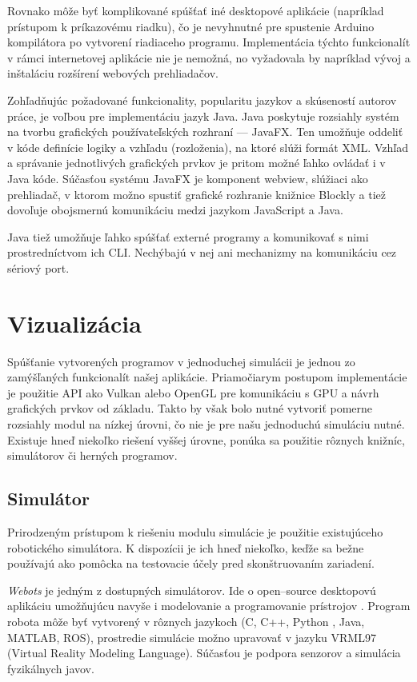 Rovnako môže byť komplikované spúšťať iné desktopové aplikácie (napríklad prístupom k príkazovému riadku), čo je nevyhnutné pre spustenie Arduino kompilátora po vytvorení riadiaceho programu. Implementácia týchto funkcionalít v rámci internetovej aplikácie nie je nemožná, no vyžadovala by napríklad vývoj a inštaláciu rozšírení webových prehliadačov.

Zohľadňujúc požadované funkcionality, popularitu jazykov a skúseností autorov práce, je voľbou pre implementáciu jazyk Java. Java poskytuje rozsiahly systém na tvorbu grafických používateľských rozhraní --- JavaFX. Ten umožňuje oddeliť v kóde definície logiky a vzhľadu (rozloženia), na ktoré slúži formát XML. Vzhľad a správanie jednotlivých grafických prvkov je pritom možné ľahko ovládať i v Java kóde. Súčasťou systému JavaFX je komponent webview, slúžiaci ako prehliadač, v ktorom možno spustiť grafické rozhranie knižnice Blockly a tiež dovoľuje obojsmernú komunikáciu medzi jazykom JavaScript a Java.

Java tiež umožňuje ľahko spúšťať externé programy a komunikovať s nimi prostredníctvom ich CLI. Nechýbajú v nej ani mechanizmy na komunikáciu cez sériový port.


\section{Vizualizácia}
Spúšťanie vytvorených programov v jednoduchej simulácii je jednou zo zamýšľaných funkcionalít našej aplikácie. Priamočiarym postupom implementácie je použitie API ako Vulkan alebo OpenGL pre komunikáciu s GPU a návrh grafických prvkov od základu. Takto by však bolo nutné vytvoriť pomerne rozsiahly modul na nízkej úrovni, čo nie je pre našu jednoduchú simuláciu nutné. Existuje hneď niekoľko riešení vyššej úrovne, ponúka sa použitie rôznych knižníc, simulátorov či herných programov.

\subsection{Simulátor}
Prirodzeným prístupom k riešeniu modulu simulácie je použitie existujúceho robotického simulátora. K dispozícii je ich hneď niekoľko, keďže sa bežne používajú ako pomôcka na testovacie účely pred skonštruovaním zariadení.

\textit{Webots} je jedným z dostupných simulátorov. Ide o open--source desktopovú aplikáciu umožňujúcu navyše i modelovanie a programovanie prístrojov \cite{Webots}. Program robota môže byť vytvorený v rôznych jazykoch (C, C++, Python , Java, MATLAB, ROS), prostredie simulácie možno upravovať v jazyku VRML97 (Virtual Reality Modeling Language). Súčasťou je podpora senzorov a simulácia fyzikálnych javov.


